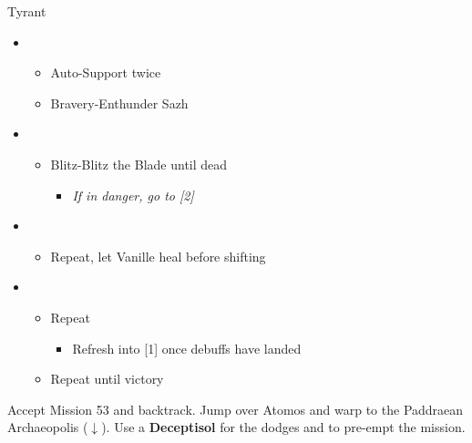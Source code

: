 \begin{battle}{Tyrant}
	\begin{itemize}
		\item \third
			\begin{itemize}
				\item Auto-Support twice
				\item Bravery-Enthunder Sazh
			\end{itemize}
		\item \second
			\begin{itemize}
				\item Blitz-Blitz the Blade until dead
					\begin{itemize}
						\item \textit{If in danger, go to [2]}
					\end{itemize}
			\end{itemize}
		\item \first
			\begin{itemize}
				\item Repeat, let Vanille heal before shifting
			\end{itemize}
		\item \second
			\begin{itemize}
				\item Repeat
					\begin{itemize}
						\item Refresh into [1] once debuffs have landed
					\end{itemize}
				\item Repeat until victory
			\end{itemize}
	\end{itemize}
\end{battle}

Accept Mission 53 and backtrack.
Jump over Atomos and warp to the Paddraean Archaeopolis ($\downarrow$).
Use a \textbf{Deceptisol} for the dodges and to pre-empt the mission.

